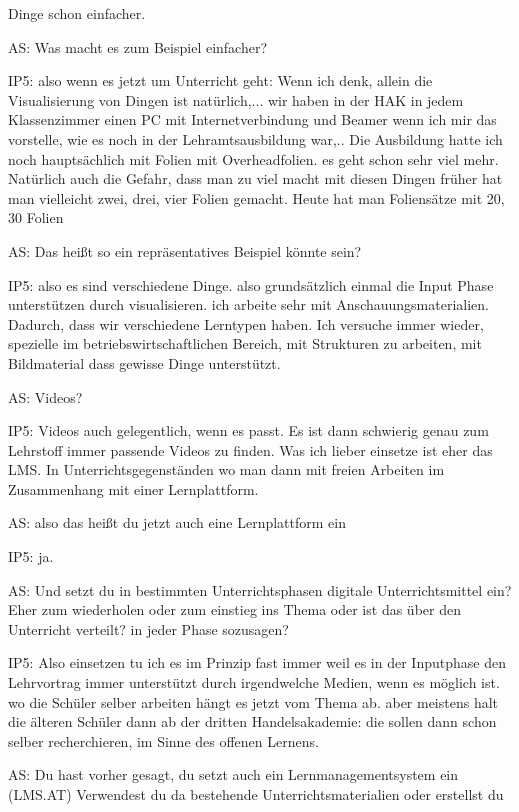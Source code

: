 \documentclass[fontsize=11pt,paper=a4]{scrbook}
\begin{document}
{\begin{itemize*}
Dinge schon einfacher.
\item[AS:]Was macht es zum Beispiel einfacher?
\item[IP5:] also
wenn es jetzt um Unterricht geht: Wenn ich denk, allein die Visualisierung von
Dingen ist natürlich,... wir haben in der HAK in 
jedem Klassenzimmer einen PC mit
Internetverbindung und Beamer wenn ich mir das vorstelle, wie es noch in der
Lehramtsausbildung war,.. Die Ausbildung hatte
ich noch hauptsächlich mit Folien mit
Overheadfolien. es geht schon sehr viel mehr.
Natürlich auch die Gefahr, dass man zu
viel macht mit diesen Dingen früher hat
man vielleicht zwei, drei, vier Folien
gemacht. Heute hat man Foliensätze mit 20, 30 Folien
\item[AS:] Das heißt so ein repräsentatives Beispiel könnte sein?
\item[IP5:] also es sind verschiedene Dinge.
also grundsätzlich einmal die
Input Phase unterstützen durch
visualisieren. ich arbeite sehr mit Anschauungsmaterialien. Dadurch, dass wir verschiedene
Lerntypen haben. Ich versuche immer
wieder, spezielle im
betriebswirtschaftlichen Bereich, mit
Strukturen zu arbeiten, mit Bildmaterial
dass gewisse Dinge unterstützt.
\item[AS:] Videos?
\item[IP5:] Videos auch gelegentlich, wenn es passt. Es
ist dann schwierig genau zum Lehrstoff
immer passende Videos zu finden. Was ich lieber einsetze ist eher das LMS. In 
Unterrichtsgegenständen wo man dann mit freien Arbeiten im Zusammenhang mit
einer Lernplattform.
\item[AS:] also das
heißt du jetzt auch eine Lernplattform ein
\item[IP5:] ja.
\item[AS:] Und setzt du in bestimmten Unterrichtsphasen digitale Unterrichtsmittel ein? Eher zum
wiederholen oder zum einstieg ins Thema
oder ist das
über den Unterricht verteilt? in jeder
Phase sozusagen?
\item[IP5:] Also einsetzen tu ich es im Prinzip fast immer weil es in der Inputphase den Lehrvortrag
immer unterstützt durch irgendwelche
Medien, wenn es möglich ist. wo die
Schüler selber arbeiten hängt es jetzt vom
Thema ab. aber meistens halt die älteren
Schüler dann ab der dritten
Handelsakademie: die sollen dann schon selber
recherchieren, im Sinne des offenen Lernens.
\item[AS:] Du hast vorher gesagt, du setzt auch ein Lernmanagementsystem ein (LMS.AT) Verwendest du da bestehende
Unterrichtsmaterialien oder erstellst du

\end{itemize*}}
\end{document}
